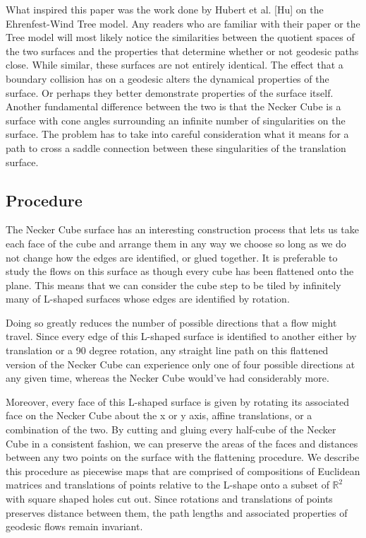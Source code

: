 \documentclass[]{article}
\begin{document}
What inspired this paper was the work done by Hubert et al. [Hu] on the Ehrenfest-Wind Tree model. Any readers who are familiar with their paper or the Tree model will most likely notice the similarities between the quotient spaces of the two surfaces and the properties that determine whether or not geodesic paths close. While similar, these surfaces are not entirely identical. The effect that a boundary collision has on a geodesic alters the dynamical properties of the surface. Or perhaps they better demonstrate properties of the surface itself. Another fundamental difference between the two is that the Necker Cube is a surface with cone angles surrounding an infinite number of singularities on the surface. The problem has to take into careful consideration what it means for a path to cross a saddle connection between these singularities of the translation surface.



\subsection{Procedure}
The Necker Cube surface has an interesting construction process that lets us take each face of the cube and arrange them in any way we choose so long as we do not change how the edges are identified, or glued together. It is preferable to study the flows on this surface as though every cube has been flattened onto the plane. This means that we can consider the cube step to be tiled by infinitely many of L-shaped surfaces whose edges are identified by rotation.

Doing so greatly reduces the number of possible directions that a flow might travel. Since every edge of this L-shaped surface is identified to another either by translation or a 90 degree rotation, any straight line path on this flattened version of the Necker Cube can experience only one of four possible directions at any given time, whereas the Necker Cube would've had considerably more.

Moreover, every face of this L-shaped surface is given by rotating its associated face on the Necker Cube about the x or y axis, affine translations, or a combination of the two. By cutting and gluing every half-cube of the Necker Cube in a consistent fashion, we can preserve the areas of the faces and distances between any two points on the surface with the flattening procedure. We describe this procedure as piecewise maps that are comprised of compositions of Euclidean matrices and translations of points relative to the L-shape onto a subset of $\mathbb{R}^{2}$ with square shaped holes cut out. Since rotations and translations of points preserves distance between them, the path lengths and  associated properties of geodesic flows remain invariant.
\end{document}
